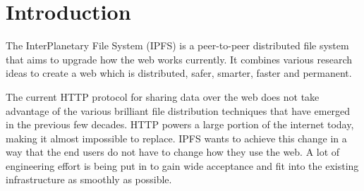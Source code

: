 \chapter{Introduction}

The InterPlanetary File System (IPFS)\cite{DBLP:journals/corr/Benet14} is a peer-to-peer distributed file system that aims to upgrade how the web works currently. It combines various research ideas to create a web which is distributed, safer, smarter, faster and permanent.

The current HTTP protocol for sharing data over the web does not take advantage of the various brilliant file distribution techniques that have emerged in the previous few decades. HTTP powers a large portion of the internet today, making it almost impossible to replace. IPFS wants to achieve this change in a way that the end users do not have to change how they use the web. A lot of engineering effort is being put in to gain wide acceptance and fit into the existing infrastructure as smoothly as possible.